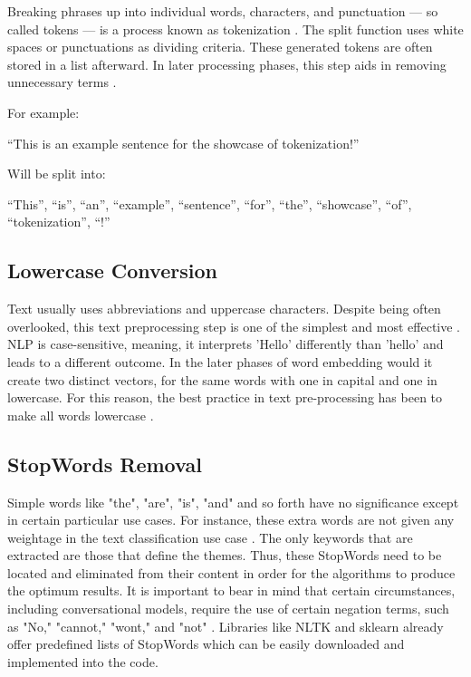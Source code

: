 Breaking phrases up into individual words, characters, and punctuation — so called tokens — is a process known as tokenization \citep{tabassum_survey_2020}. The split function uses white spaces or punctuations as dividing criteria. These generated tokens are often stored in a list afterward. In later processing phases, this step aids in removing unnecessary terms \citep{tabassum_survey_2020}. 

For example:

“This is an example sentence for the showcase of tokenization!”

Will be split into:

“This”, “is”, “an”, “example”, “sentence”, “for”, “the”, “showcase”, “of”, “tokenization”, “!”

\subsection{Lowercase Conversion}

Text usually uses abbreviations and uppercase characters. Despite being often overlooked, this text preprocessing step is one of the simplest and most effective \citep{tabassum_survey_2020}. NLP is case-sensitive, meaning, it interprets 'Hello' differently than 'hello' and leads to a different outcome. In the later phases of word embedding would it create two distinct vectors, for the same words with one in capital and one in lowercase. For this reason, the best practice in text pre-processing has been to make all words lowercase \citep{tabassum_survey_2020}.

\subsection{StopWords Removal}

Simple words like "the", "are", "is", "and" and so forth have no significance except in certain particular use cases. For instance, these extra words are not given any weightage in the text classification use case \citep{tabassum_survey_2020}. The only keywords that are extracted are those that define the themes. Thus, these StopWords need to be located and eliminated from their content in order for the algorithms to produce the optimum results. It is important to bear in mind that certain circumstances, including conversational models, require the use of certain negation terms, such as "No," "cannot," "wont," and "not" \citep{tabassum_survey_2020}. Libraries like NLTK and sklearn already offer predefined lists of StopWords which can be easily downloaded and implemented into the code.

